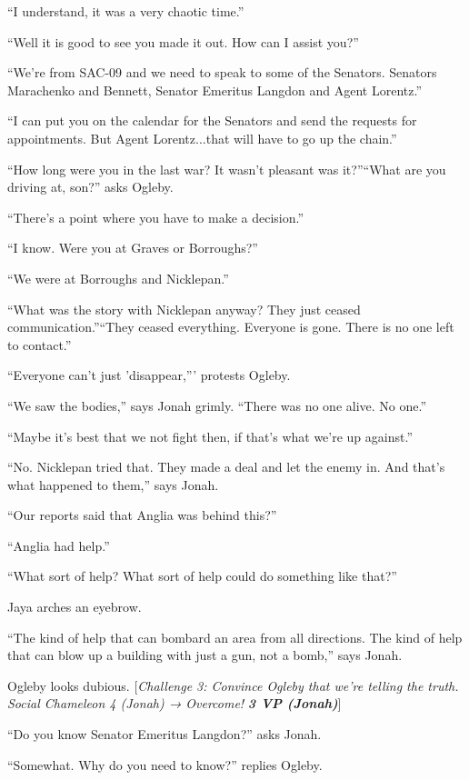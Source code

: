 ``I understand, it was a very chaotic time.''

``Well it is good to see you made it out.  How can I assist you?''

``We're from SAC-09 and we need to speak to some of the Senators.  Senators Marachenko and Bennett, Senator Emeritus Langdon and Agent Lorentz.''

``I can put you on the calendar for the Senators and send the requests for appointments.  But Agent Lorentz...that will have to go up the chain.''

``How long were you in the last war?  It wasn't pleasant was it?''``What are you driving at, son?'' asks Ogleby.

``There's a point where you have to make a decision.''

``I know.  Were you at Graves or Borroughs?''

``We were at Borroughs and Nicklepan.''

``What was the story with Nicklepan anyway?  They just ceased communication.''``They ceased everything.  Everyone is gone.  There is no one left to contact.''

``Everyone can't just 'disappear,''' protests Ogleby.

``We saw the bodies,'' says Jonah grimly. ``There was no one alive.  No one.''

``Maybe it's best that we not fight then, if that's what we're up against.''

``No.  Nicklepan tried that.  They made a deal and let the enemy in.  And that's what happened to them,'' says Jonah.

``Our reports said that Anglia was behind this?''

``Anglia had help.''

``What sort of help?  What sort of help could do something like that?''

Jaya arches an eyebrow.

``The kind of help that can bombard an area from all directions.  The kind of help that can blow up a building with just a gun, not a bomb,'' says Jonah.

Ogleby looks dubious.  {[}\textit{Challenge 3: Convince Ogleby that we're telling the truth. Social Chameleon 4 (Jonah) → Overcome! }\textit{\textbf{3 VP (Jonah)}}{]} 



``Do you know Senator Emeritus Langdon?'' asks Jonah.

``Somewhat. Why do you need to know?'' replies Ogleby.

